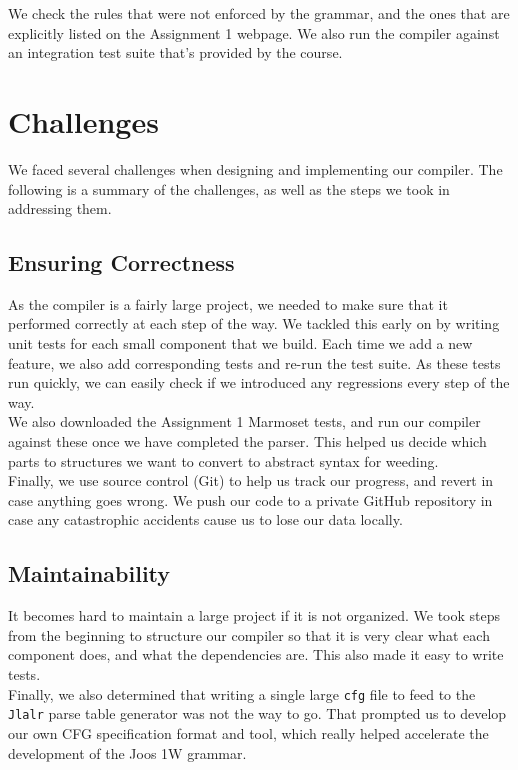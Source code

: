 \documentclass[12pt, a4paper]{article}
\begin{document}
We check the rules that were not enforced by the grammar, and the ones that are explicitly listed on the Assignment 1 webpage. We also run the compiler against an integration test suite that's provided by the course.


\section{Challenges}

We faced several challenges when designing and implementing our compiler. The following is a summary of the challenges, as well as the steps we took in addressing them.

\subsection{Ensuring Correctness}

As the compiler is a fairly large project, we needed to make sure that it performed correctly at each step of the way. We tackled this early on by writing unit tests for each small component that we build. Each time we add a new feature, we also add corresponding tests and re-run the test suite. As these tests run quickly, we can easily check if we introduced any regressions every step of the way. \\

We also downloaded the Assignment 1 Marmoset tests, and run our compiler against these once we have completed the parser. This helped us decide which parts to structures we want to convert to abstract syntax for weeding. \\

Finally, we use source control (Git) to help us track our progress, and revert in case anything goes wrong. We push our code to a private GitHub repository in case any catastrophic accidents cause us to lose our data locally.

\subsection{Maintainability}

It becomes hard to maintain a large project if it is not organized. We took steps from the beginning to structure our compiler so that it is very clear what each component does, and what the dependencies are. This also made it easy to write tests. \\

Finally, we also determined that writing a single large \verb|cfg| file to feed to the \verb|Jlalr| parse table generator was not the way to go. That prompted us to develop our own CFG specification format and tool, which really helped accelerate the development of the Joos 1W grammar.
\end{document}
